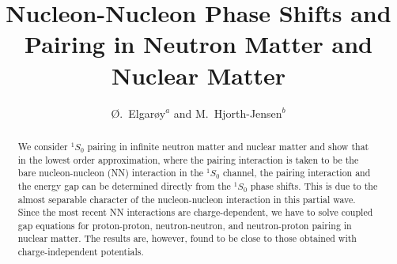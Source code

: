 


\draft

\title{Nucleon-Nucleon Phase Shifts and Pairing in 
Neutron Matter and Nuclear Matter}
 
\author{\O.\ Elgar\o y$^a$ and M.\ Hjorth-Jensen$^b$}

\address{$^a$Department of Physics, University of Oslo, N-0316 Oslo, Norway}

\address{$^b$Nordita, Blegdamsvej 17, DK-2100 K\o benhavn \O, Denmark}

\maketitle

\begin{abstract}

We consider $^1S_0$ pairing in infinite neutron matter 
and nuclear matter 
and show that in the lowest order approximation, where the pairing 
interaction is taken to be the bare nucleon-nucleon (NN) interaction 
in the $^1S_0$ channel, the pairing interaction and the energy gap 
can be determined directly from the $^1S_0$ phase shifts.  
This is due to the almost separable 
character of the nucleon-nucleon interaction in this partial wave. 
Since the most recent NN interactions are charge-dependent, we 
have to solve coupled gap equations for proton-proton, neutron-neutron, 
and neutron-proton pairing in nuclear matter.  The results are, 
however, found to be close to those obtained with charge-independent 
potentials.


\end{abstract}


